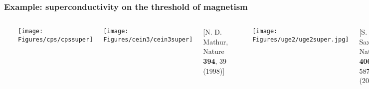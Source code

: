






\begin{frame}[label=ThreshMagn]
\frametitle{Example: superconductivity on the threshold of magnetism}
\begin{columns}[t]
\vspace{-4ex}
\centerline{~}
{\texttt{[image: \\Figures/cps/cpssuper]}}

{\texttt{[image: \\Figures/cein3/cein3super]}\\
\centerline{\scriptsize{[N. D. Mathur, Nature {\bf 394}, 39 (1998)]
  }}}

\centerline{~}
{\texttt{[image: \\Figures/uge2/uge2super.jpg]}\\
\centerline{\scriptsize{[S. S. Saxena, Nature {\bf 406} 587 (2000)]
  }}}

\vspace{2ex}


{
Further examples:

\hl{CeCu$_2$Si$_2$}, CeNi$_2$Ge$_2$, CeRh$_2$Si$_2$, 
Ce-1-1-5, Pu-1-1-5, URhGe, ...

}
\end{columns}
\end{frame}


